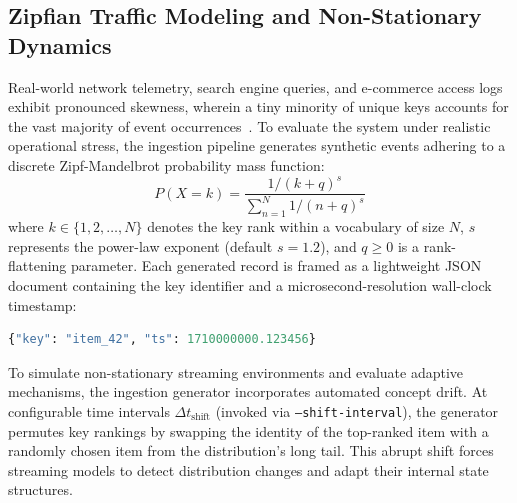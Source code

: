 \subsection{Zipfian Traffic Modeling and Non-Stationary Dynamics}
Real-world network telemetry, search engine queries, and e-commerce access logs exhibit pronounced skewness, wherein a tiny minority of unique keys accounts for the vast majority of event occurrences~\cite{zipf}. To evaluate the system under realistic operational stress, the ingestion pipeline generates synthetic events adhering to a discrete Zipf-Mandelbrot probability mass function:
\begin{equation}
    P(X = k) = \frac{1 / (k + q)^s}{\sum_{n=1}^N 1 / (n + q)^s}
\end{equation}
where $k \in \{1, 2, \dots, N\}$ denotes the key rank within a vocabulary of size $N$, $s$ represents the power-law exponent (default $s = 1.2$), and $q \ge 0$ is a rank-flattening parameter. Each generated record is framed as a lightweight JSON document containing the key identifier and a microsecond-resolution wall-clock timestamp:
\begin{lstlisting}[language=Python, caption=Schema of stream events published to Kafka.]
{"key": "item_42", "ts": 1710000000.123456}
\end{lstlisting}

To simulate non-stationary streaming environments and evaluate adaptive mechanisms, the ingestion generator incorporates automated concept drift. At configurable time intervals $\Delta t_{\text{shift}}$ (invoked via \texttt{--shift-interval}), the generator permutes key rankings by swapping the identity of the top-ranked item with a randomly chosen item from the distribution's long tail. This abrupt shift forces streaming models to detect distribution changes and adapt their internal state structures.

